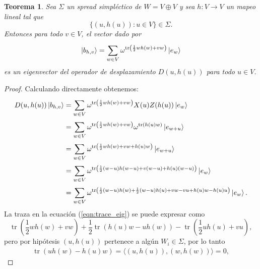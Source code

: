 \documentclass[a4paper]{report}
\DeclareMathOperator{\tr}{tr}
\newtheorem{theorem}{Teorema}
\begin{document}
  \begin{theorem}
    \label{lemma:h_mubs}
    Sea $\Sigma$ un spread simpléctico de $W = V \oplus V$ y
    sea $h : V \to V$ un mapeo lineal tal que
    \begin{equation}
      \{(u,h(u)) : u \in V\} \in \Sigma.
    \end{equation}
    Entonces para todo $v \in V$, el vector dado por
    \begin{equation}
      \ket{b_{h,v}}
      = \sum_{w \in V}^{}
      \omega^{\tr\left(
          \frac{1}{2} w
        h(w) + v w
      \right) } \ket{e_w}
    \end{equation} 
    es un eigenvector del operador de desplazamiento
    $D(u,h(u))$ para todo $u \in V$.
  \end{theorem}
  \begin{proof}
    Calculando directamente obtenemos:
    \begin{align}
      D(u,h(u)) \ket{b_{h,v}}
      &= \sum_{w \in V}^{}
      \omega^{\tr\left(
          \frac{1}{2} w h(w) + v w
      \right) }
      X(u)Z(h(u)) \ket{e_w} \\
      &= \sum_{w \in V}^{}
      \omega^{\tr\left(
          \frac{1}{2} w h(w) + v w
      \right) }
      \omega^{\tr(h(u) w)}
      \ket{e_{w+u}} \\
      &= \sum_{w \in V}^{}
      \omega^{\tr\left(
          \frac{1}{2} w h(w) + v w + h(u) w
      \right) }
      \ket{e_{w+u}} \\
      &= \sum_{w \in V}^{}
      \omega^{\tr\left(
          \frac{1}{2} (w-u) h(w-u) + v (w-u) + h(u) (w-u)
      \right) }
      \ket{e_w} \\
      &= \sum_{w \in V}^{}
      \omega^{\tr\left(
        \frac{1}{2}(w-u) h(w) + \frac{1}{2}(w-u) h(u)
        + v w - v u + h(u) w - h(u) u
      \right) }
      \ket{e_w}.
      \label{eqn:trace_eig}
    \end{align}
    La traza en la ecuación (\ref{eqn:trace_eig}) se puede
    expresar como
    \begin{equation}
      \tr\left(
        \frac{1}{2} w h(w) + v w
      \right)
      + \frac{1}{2}\tr\left(
        h(u) w - u h(w)
      \right)
      - \tr\left(
        \frac{1}{2} u h(u) + v u
      \right),
    \end{equation}
    pero por hipótesis $(u,h(u))$ pertenece a algún $W_i \in
    \Sigma$, por lo tanto
    \begin{align}
      \tr\left( u h(w) - h(u) w \right)
      = \langle (u,h(u)), (w,h(w)) \rangle
      = 0,

\end{align}
\end{proof}
\end{document}
